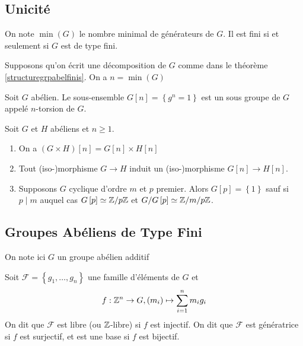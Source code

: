 \documentclass{cours}
\begin{document}
\subsection{Unicité}
\begin{definition}
    On note $\min(G)$ le nombre minimal de générateurs de $G$. Il est fini si et seulement si $G$ est de type fini. 
\end{definition}
\begin{proposition}
    Supposons qu'on écrit une décomposition de $G$ comme dans le théorème \ref{structuregrpabelfinis}. On a $n = \min{(G)}$
\end{proposition}

\begin{definition}
    Soit $G$ abélien. Le sous-ensemble $G\left[n\right] = \left\{g^{n} = 1\right\}$ est un sous groupe de $G$ appelé $n$-torsion de $G$. 
\end{definition}

\begin{lemma}
    Soit $G$ et $H$ abéliens et $n \geq 1$.
    \begin{enumerate}
        \item On a $\left(G \times H\right)\left[n\right] = G\left[n\right] \times H\left[n\right]$
        \item Tout (iso-)morphisme $G \rightarrow H$ induit un (iso-)morphisme $G\left[n\right] \rightarrow H\left[n\right]$.
        \item Supposons $G$ cyclique d'ordre $m$ et $p$ premier. Alors $G\left[p\right] = \left\{1\right\}$ sauf si $p \mid m$ auquel cas $G\left[p\right] \simeq \mathbb{Z}/p\mathbb{Z}$ et $G/G\left[p\right] \simeq \mathbb{Z}/m/p\mathbb{Z}$.
    \end{enumerate}
\end{lemma}

\subsection{Groupes Abéliens de Type Fini}
On note ici $G$ un groupe abélien additif

\begin{definition}
    Soit $\mathcal{F} = \left\{g_{1},\ldots, g_{n}\right\}$ une famille d'éléments de $G$ et 
    \[
        f : \mathbb{Z}^{n} \rightarrow G, (m_{i}) \mapsto \sum_{i = 1}^{n}m_{i}g_{i}
    \]
    On dit que $\mathcal{F}$ est libre (ou $\mathbb{Z}$-libre) si $f$ est injectif. On dit que $\mathcal{F}$ est génératrice si $f$ est surjectif, et est une base si $f$ est bijectif.
\end{definition}
\end{document}
